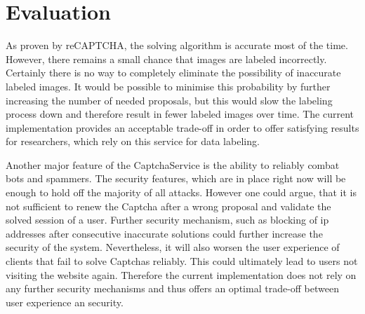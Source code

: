 \section{Evaluation}
\label{sec:evaluation}

As proven by reCAPTCHA, the solving algorithm is accurate most of the time. However, there remains a small chance that images are labeled incorrectly. Certainly there is no way to completely eliminate the possibility of inaccurate labeled images. It would be possible to minimise this probability by further increasing the number of needed proposals, but this would slow the labeling process down and therefore result in fewer labeled images over time. The current implementation provides an acceptable trade-off in order to offer satisfying results for researchers, which rely on this service for data labeling.

Another major feature of the CaptchaService is the ability to reliably combat bots and spammers. The security features, which are in place right now will be enough to hold off the majority of all attacks. However one could argue, that it is not sufficient to renew the Captcha after a wrong proposal and validate the solved session of a user. Further security mechanism, such as blocking of ip addresses after consecutive inaccurate solutions could further increase the security of the system. Nevertheless, it will also worsen the user experience of clients that fail to solve Captchas reliably. This could ultimately lead to users not visiting the website again. Therefore the current implementation does not rely on any further security mechanisms and thus offers an optimal trade-off between user experience an security.

\clearpage

